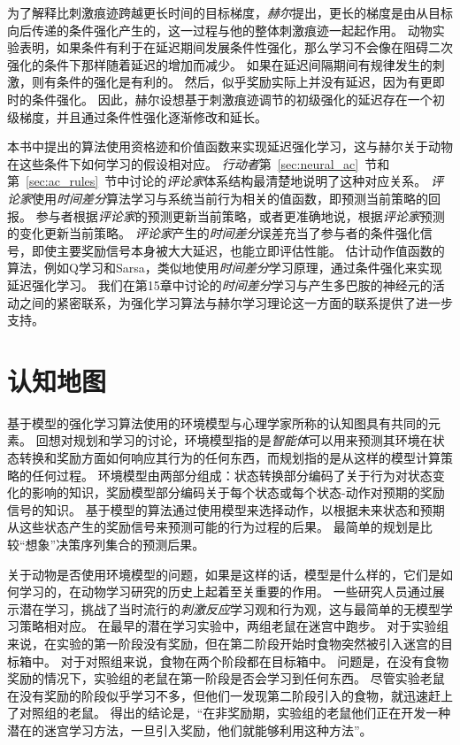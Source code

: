 为了解释比刺激痕迹跨越更长时间的目标梯度，\textit{赫尔}\cite{hull1943principles}提出，更长的梯度是由从目标向后传递的条件强化产生的，这一过程与他的整体刺激痕迹一起起作用。
动物实验表明，如果条件有利于在延迟期间发展条件性强化，那么学习不会像在阻碍二次强化的条件下那样随着延迟的增加而减少。
如果在延迟间隔期间有规律发生的刺激，则有条件的强化是有利的。
然后，似乎奖励实际上并没有延迟，因为有更即时的条件强化。
因此，赫尔设想基于刺激痕迹调节的初级强化的延迟存在一个初级梯度，并且通过条件性强化逐渐修改和延长。


本书中提出的算法使用资格迹和价值函数来实现延迟强化学习，这与赫尔关于动物在这些条件下如何学习的假设相对应。
\textit{行动者}第~\ref{sec:neural_ac}~节和第~\ref{sec:ac_rules}~节中讨论的\textit{评论家}体系结构最清楚地说明了这种对应关系。
\textit{评论家}使用\textit{时间差分}算法学习与系统当前行为相关的值函数，即预测当前策略的回报。
参与者根据\textit{评论家}的预测更新当前策略，或者更准确地说，根据\textit{评论家}预测的变化更新当前策略。
\textit{评论家}产生的\textit{时间差分}误差充当了参与者的条件强化信号，即使主要奖励信号本身被大大延迟，也能立即评估性能。
估计动作值函数的算法，例如Q学习和Sarsa，类似地使用\textit{时间差分}学习原理，通过条件强化来实现延迟强化学习。
我们在第15章中讨论的\textit{时间差分}学习与产生多巴胺的神经元的活动之间的紧密联系，为强化学习算法与赫尔学习理论这一方面的联系提供了进一步支持。


\section{认知地图} \label{sec:cognitive_maps}

基于模型的强化学习算法使用的环境模型与心理学家所称的认知图具有共同的元素。
回想对规划和学习的讨论，环境模型指的是\textit{智能体}可以用来预测其环境在状态转换和奖励方面如何响应其行为的任何东西，而规划指的是从这样的模型计算策略的任何过程。
环境模型由两部分组成：状态转换部分编码了关于行为对状态变化的影响的知识，奖励模型部分编码关于每个状态或每个状态-动作对预期的奖励信号的知识。
基于模型的算法通过使用模型来选择动作，以根据未来状态和预期从这些状态产生的奖励信号来预测可能的行为过程的后果。
最简单的规划是比较“想象”决策序列集合的预测后果。


关于动物是否使用环境模型的问题，如果是这样的话，模型是什么样的，它们是如何学习的，在动物学习研究的历史上起着至关重要的作用。
一些研究人员通过展示潜在学习，挑战了当时流行的\textit{刺激反应}学习观和行为观，这与最简单的无模型学习策略相对应。
在最早的潜在学习实验中，两组老鼠在迷宫中跑步。
对于实验组来说，在实验的第一阶段没有奖励，但在第二阶段开始时食物突然被引入迷宫的目标箱中。
对于对照组来说，食物在两个阶段都在目标箱中。
问题是，在没有食物奖励的情况下，实验组的老鼠在第一阶段是否会学习到任何东西。
尽管实验老鼠在没有奖励的阶段似乎学习不多，但他们一发现第二阶段引入的食物，就迅速赶上了对照组的老鼠。
得出的结论是，“在非奖励期，实验组的老鼠他们正在开发一种潜在的迷宫学习方法，一旦引入奖励，他们就能够利用这种方法”\cite{blodgett1929effect}。




